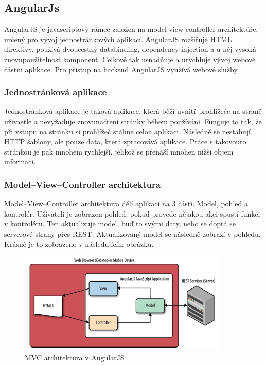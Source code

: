 \documentclass[czech,master,public,dept460,male,cpdeclaration,twoside]{diploma}
\begin{document}
\subsection{AngularJs}
AngularJS je javascriptový rámec založen na model-view-controller architektůře, určený pro vývoj jednostránkových aplikací. AngularJS rozšiřuje HTML direktivy, používá dvoucestný databinding, dependency injection a u něj vysoká znovupoužitelnost komponent. Celkově tak usnadňuje a urychluje vývoj webové částni aplikace. Pro přístup na backend AngularJS využívá webové služby. \cite{coJeAngular}

\subsubsection{Jednostránková aplikace}
Jednostránková aplikace je taková aplikace, která běží uvnitř prohlížeče na straně uživaetle a nevyžaduje znovunačtení stránky během používáni. Funguje to tak, že při vstupu na stránku si prohlížeč stáhne celou aplikaci. Následně se nestahují HTTP šablony, ale pouze data, která zpracovává aplikace. Práce s takovouto stránkou je pak mnohem rychlejší, jelikož se přenáší mnohen nižší objem informaci. \cite{SPA}

\subsubsection{Model–View–Controller architektura}
Model–View–Controller architektura dělí aplikaci na 3 části. Model, pohled a kontrolér. Uživateli je zobrazen pohled, pokud provede nějakou akci spustí funkci v kontroléru. Ten aktualizuje model, buď to svými daty, nebo se doptá se serverové strany přes REST. Aktualizovaný model se následně zobrazí v pohledu. Krásně je to zobrazeno v následujícím obrázku.
\begin{figure}[H]
\centering\includegraphics[width=0.9\textwidth]{Figures/MVC.png}\caption{MVC architektura v AngularJS}
\end{figure}
\end{document}
